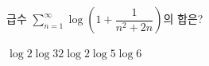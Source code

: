 급수 $\displaystyle\sum_{n=1}^{\infty}\log\left(1+\dfrac{1}{n^2+2n}\right)$의 합은?
\begin{choices32}{$\log 2$}{$\log 3$}{$2\log 2$}{$\log 5$}{$\log 6$}\end{choices32}
